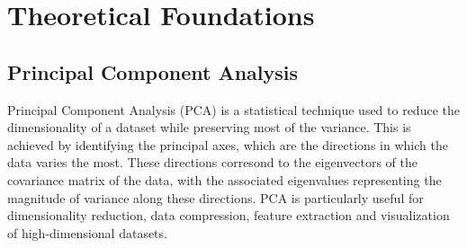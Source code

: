 \ifpdf
    \graphicspath{{content/chapter2/figs/raster/}{content/chapter2/figs/pdf/}{content/chapter2/figs/}}
    \else
    \graphicspath{{content/chapter2/figs/vector/}{content/chapter2/figs/}}
    \fi
    
\nomenclature[g-pi]{$\pi$}{ $\simeq 3.14\ldots$}



\chapter{Theoretical Foundations}\label{sec:theory}

\section{Principal Component Analysis}
\label{sec:theory:pca}
Principal Component Analysis (PCA) is a statistical technique used to reduce the dimensionality of a dataset while preserving most of the variance. This is achieved by identifying the principal axes, which are the directions in which the data varies the most. These directions corresond to the eigenvectors of the covariance matrix of the data, with the associated eigenvalues representing the magnitude of variance along these directions. PCA is particularly useful for dimensionality reduction, data compression, feature extraction and visualization of high-dimensional datasets. 

